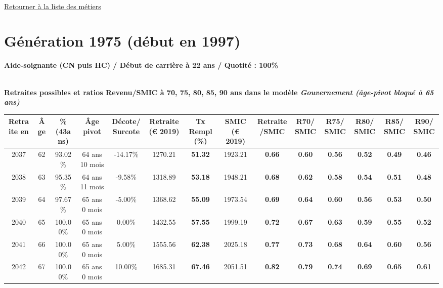~\\ 
 
 \hyperlink{page.2}{\noindent Retourner à la liste des métiers}

 \newpage 

\section{Génération 1975 (début en 1997)\label{AideSoignant_100_1975_22_0}} 
 
{\bf \noindent Aide-soignante (CN puis HC) / Début de carrière à 22 ans / Quotité : 100\%}  ~ 

 ~\\{\bf \noindent Retraites possibles et ratios Revenu/SMIC à 70, 75, 80, 85, 90 ans dans le modèle \emph{Gouvernement (âge-pivot bloqué à 65 ans)}}  
 
\begin{adjustbox}{max width=\textwidth} 
\begin{tabular}[htb]{|c|c||c|c|c||c|c||c|c||c|c|c|c|c|} 
\hline 
 Retraite en &  Âge &  \%(43ans) &  Âge pivot &  Décote/Surcote &  Retraite (\euro{} 2019) &  Tx Rempl(\%) &  SMIC (\euro{} 2019) &  Retraite/SMIC &  R70/SMIC &  R75/SMIC &  R80/SMIC &  R85/SMIC &  R90/SMIC \\ 
\hline \hline 
 2037 &  62 &  93.02\% &  64 ans 10 mois &  -14.17\% &  1270.21 &  {\bf 51.32} &  1923.21 &  {\bf {\color{red} 0.66}} &  {\bf {\color{red} 0.60}} &  {\bf {\color{red} 0.56}} &  {\bf {\color{red} 0.52}} &  {\bf {\color{red} 0.49}} &  {\bf {\color{red} 0.46}} \\ 
\hline 
 2038 &  63 &  95.35\% &  64 ans 11 mois &  -9.58\% &  1318.89 &  {\bf 53.18} &  1948.21 &  {\bf {\color{red} 0.68}} &  {\bf {\color{red} 0.62}} &  {\bf {\color{red} 0.58}} &  {\bf {\color{red} 0.54}} &  {\bf {\color{red} 0.51}} &  {\bf {\color{red} 0.48}} \\ 
\hline 
 2039 &  64 &  97.67\% &  65 ans 0 mois &  -5.00\% &  1368.62 &  {\bf 55.09} &  1973.54 &  {\bf {\color{red} 0.69}} &  {\bf {\color{red} 0.64}} &  {\bf {\color{red} 0.60}} &  {\bf {\color{red} 0.56}} &  {\bf {\color{red} 0.53}} &  {\bf {\color{red} 0.50}} \\ 
\hline 
 2040 &  65 &  100.00\% &  65 ans 0 mois &  0.00\% &  1432.55 &  {\bf 57.55} &  1999.19 &  {\bf {\color{red} 0.72}} &  {\bf {\color{red} 0.67}} &  {\bf {\color{red} 0.63}} &  {\bf {\color{red} 0.59}} &  {\bf {\color{red} 0.55}} &  {\bf {\color{red} 0.52}} \\ 
\hline 
 2041 &  66 &  100.00\% &  65 ans 0 mois &  5.00\% &  1555.56 &  {\bf 62.38} &  2025.18 &  {\bf {\color{red} 0.77}} &  {\bf {\color{red} 0.73}} &  {\bf {\color{red} 0.68}} &  {\bf {\color{red} 0.64}} &  {\bf {\color{red} 0.60}} &  {\bf {\color{red} 0.56}} \\ 
\hline 
 2042 &  67 &  100.00\% &  65 ans 0 mois &  10.00\% &  1685.31 &  {\bf 67.46} &  2051.51 &  {\bf {\color{red} 0.82}} &  {\bf {\color{red} 0.79}} &  {\bf {\color{red} 0.74}} &  {\bf {\color{red} 0.69}} &  {\bf {\color{red} 0.65}} &  {\bf {\color{red} 0.61}} \\ 
\hline 
\hline 
\end{tabular} 
\end{adjustbox} 
 
